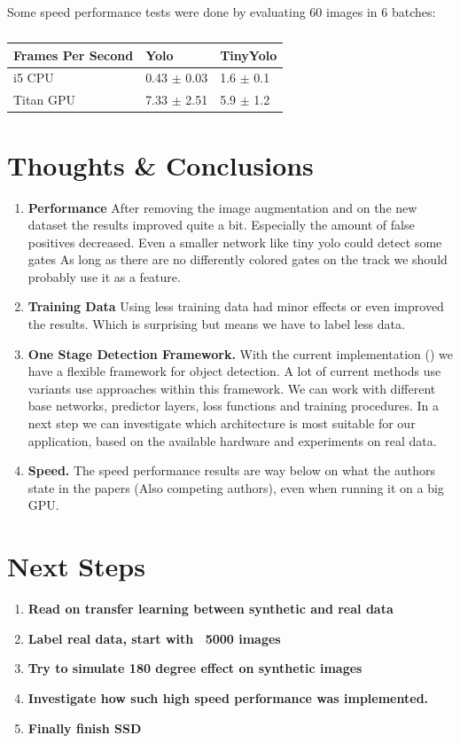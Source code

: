 \documentclass{article}
\begin{document}
Some speed performance tests were done by evaluating 60 images in 6 batches:

\begin{table}[htbp]
	\centering
	\caption{}
	\begin{tabular}{|l|l|l|}
		\hline
		Frames Per Second & Yolo & TinyYolo \\ \hline
		i5 CPU & 0.43 $\pm$ 0.03 & 1.6 $\pm$ 0.1 \\ \hline
		Titan GPU & 7.33 $\pm$ 2.51 & 5.9 $\pm$ 1.2 \\ \hline
	\end{tabular}
	\label{}
\end{table}


\section{Thoughts \& Conclusions}


\begin{enumerate}
	\item \textbf{Performance} After removing the image augmentation and on the new dataset the results improved quite a bit. Especially the amount of false positives decreased. Even a smaller network like tiny yolo could detect some gates As long as there are no differently colored gates on the track we should probably use it as a feature.
	
	\item \textbf{Training Data} Using less training data had minor effects or even improved the results. Which is surprising but means we have to label less data.
	
	\item \textbf{One Stage Detection Framework.} With the current implementation () we have a flexible framework for object detection. A lot of current methods use variants use approaches within this framework. We can work with different base networks, predictor layers, loss functions and training procedures. In a next step we can investigate which architecture is most suitable for our application, based on the available hardware and experiments on real data.
	
	\item \textbf{Speed.} The speed performance results are way below on what the authors state in the papers (Also competing authors), even when running it on a big GPU.

\end{enumerate}

\section{Next Steps}
\begin{enumerate}
		\item \textbf{Read on transfer learning between synthetic and real data}
		\item \textbf{Label real data, start with ~5000 images}
		\item \textbf{Try to simulate 180 degree effect on synthetic images}
		\item \textbf{Investigate how such high speed performance was implemented.}
		\item \textbf{Finally finish SSD}
\end{enumerate}
\newpage
\end{document}
